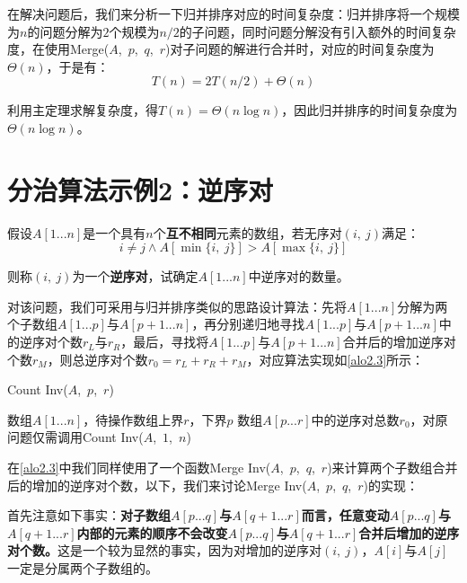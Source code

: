\documentclass[12pt,a4paper,violet,oneside]{bbe}
\begin{document}
在解决问题后，我们来分析一下归并排序对应的时间复杂度：归并排序将一个规模为$n$的问题分解为$2$个规模为$n/2$的子问题，同时问题分解没有引入额外的时间复杂度，在使用Merge($A$,~$p$,~$q$,~$r$)对子问题的解进行合并时，对应的时间复杂度为$\Theta(n)$，于是有：
$$
T(n)=2T(n/2)+\Theta(n)
$$

利用主定理求解复杂度，得$T(n)=\Theta(n\log n)$，因此归并排序的时间复杂度为$\Theta(n\log n)$。
\section{分治算法示例2：逆序对}
\begin{example}
	假设$A[1...n]$是一个具有$n$个\textbf{互不相同}元素的数组，若无序对$(i,~j)$满足：
	$$
	i\ne j\wedge A[\min\{i,~j\}]>A[\max\{i,~j\}]
	$$
	
	则称$(i,~j)$为一个\textbf{逆序对}，试确定$A[1...n]$中逆序对的数量。
\end{example}

对该问题，我们可采用与归并排序类似的思路设计算法：先将$A[1...n]$分解为两个子数组$A[1...p]$与$A[p+1...n]$，再分别递归地寻找$A[1...p]$与$A[p+1...n]$中的逆序对个数$r_L$与$r_R$，最后，寻找将$A[1...p]$与$A[p+1...n]$合并后的增加逆序对个数$r_M$，则总逆序对个数$r_0=r_L+r_R+r_M$，对应算法实现如\cref{alo2.3}所示：
\\
\begin{algorithm}[H]
	\caption{Count Inv($A$,~$p$,~$r$)}
	\label{alo2.3}
	\begin{algorithmic}[1] 
		\Require 数组$A[1...n]$，待操作数组上界$r$，下界$p$
		\Ensure  数组$A[p...r]$中的逆序对总数$r_0$，对原问题仅需调用Count Inv($A$,~$1$,~$n$)
		\textcolor{blue}{}
		\EndIf
		\textcolor{blue}{}
	\end{algorithmic} 
\end{algorithm}

在\cref{alo2.3}中我们同样使用了一个函数Merge Inv($A$,~$p$,~$q$,~$r$)来计算两个子数组合并后的增加的逆序对个数，以下，我们来讨论Merge Inv($A$,~$p$,~$q$,~$r$)的实现：

首先注意如下事实：\textbf{对子数组$A[p...q]$与$A[q+1...r]$而言，任意变动$A[p...q]$与$A[q+1...r]$内部的元素的顺序不会改变$A[p...q]$与$A[q+1...r]$合并后增加的逆序对个数。}这是一个较为显然的事实，因为对增加的逆序对$(i,~j)$，$A[i]$与$A[j]$一定是分属两个子数组的。
\end{document}
